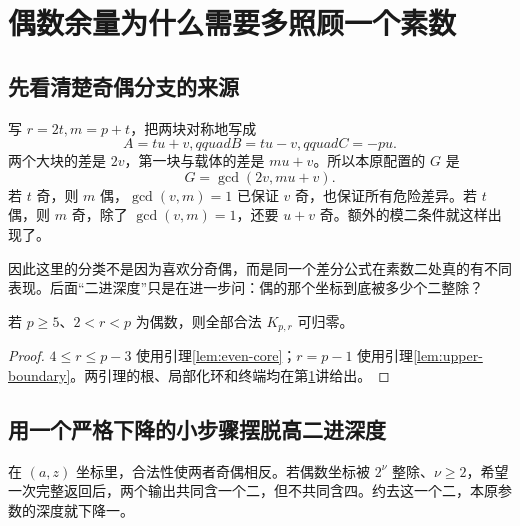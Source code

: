 \chapter{偶数余量为什么需要多照顾一个素数}\label{app:lower}
\section{先看清楚奇偶分支的来源}
写 $r=2t,m=p+t$，把两块对称地写成
\[A=tu+v,qquad B=tu-v,qquad C=-pu.
\]
两个大块的差是 $2v$，第一块与载体的差是 $mu+v$。所以本原配置的 $G$ 是
\[G=\gcd(2v,mu+v).
\]
若 $t$ 奇，则 $m$ 偶，$\gcd(v,m)=1$ 已保证 $v$ 奇，也保证所有危险差异。若 $t$ 偶，则 $m$ 奇，除了 $\gcd(v,m)=1$，还要 $u+v$ 奇。额外的模二条件就这样出现了。

因此这里的分类不是因为喜欢分奇偶，而是同一个差分公式在素数二处真的有不同表现。后面“二进深度”只是在进一步问：偶的那个坐标到底被多少个二整除？
\begin{proposition}[偶数余量的其余核心]\label{prop:even}
若 $p\ge5$、$2<r<p$ 为偶数，则全部合法 $K_{p,r}$ 可归零。
\end{proposition}
\begin{proof}
$4\le r\le p-3$ 使用引理\ref{lem:even-core}；$r=p-1$ 使用引理\ref{lem:upper-boundary}。两引理的根、局部化环和终端均在第\ref{app:lower}讲给出。
\end{proof}

\section{用一个严格下降的小步骤摆脱高二进深度}
在 $(a,z)$ 坐标里，合法性使两者奇偶相反。若偶数坐标被 $2^\nu$ 整除、$\nu\ge2$，希望一次完整返回后，两个输出共同含一个二，但不共同含四。约去这一个二，本原参数的深度就下降一。

